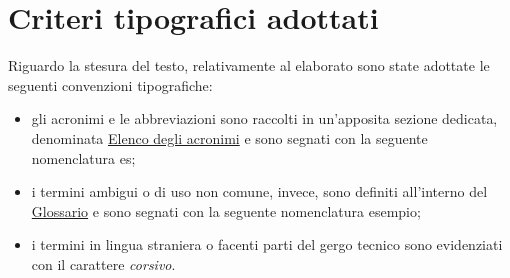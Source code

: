 \section*{Criteri tipografici adottati}
Riguardo la stesura del testo, relativamente al elaborato sono state adottate le seguenti convenzioni tipografiche:
\begin{itemize}
	\item gli acronimi e le abbreviazioni sono raccolti in un'apposita sezione dedicata, denominata \hyperref[acronimi]{Elenco degli acronimi} e sono segnati con la seguente nomenclatura \gls{es};
    \item i termini ambigui o di uso non comune, invece, sono definiti all'interno del \hyperref[glossario]{Glossario} e sono segnati con la seguente nomenclatura \gls{esempio};
	\item i termini in lingua straniera o facenti parti del gergo tecnico sono evidenziati con il carattere \textit{corsivo}.
\end{itemize}
\endgroup
\vfill
